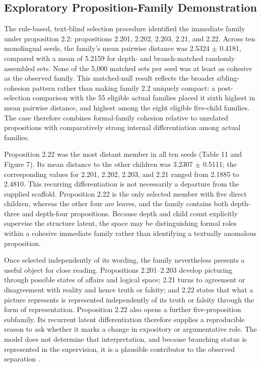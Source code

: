 \documentclass[webpdf,modern,medium,namedate]{oup-authoring-template}
\begin{document}
\clearpage
\subsection{Exploratory Proposition-Family Demonstration}
The rule-based, text-blind selection procedure identified the immediate family under proposition 2.2: propositions 2.201, 2.202, 2.203, 2.21, and 2.22. Across ten monolingual seeds, the family's mean pairwise distance was 2.5324 $\pm$ 0.4181, compared with a mean of 5.2159 for depth- and branch-matched randomly assembled sets. None of the 5,000 matched sets per seed was at least as cohesive as the observed family. This matched-null result reflects the broader sibling-cohesion pattern rather than making family 2.2 uniquely compact: a post-selection comparison with the 55 eligible actual families placed it sixth highest in mean pairwise distance, and highest among the eight eligible five-child families. The case therefore combines formal-family cohesion relative to unrelated propositions with comparatively strong internal differentiation among actual families.

Proposition 2.22 was the most distant member in all ten seeds (Table 11 and Figure 7). Its mean distance to the other children was 3.2307 $\pm$ 0.5111; the corresponding values for 2.201, 2.202, 2.203, and 2.21 ranged from 2.1885 to 2.4810. This recurring differentiation is not necessarily a departure from the supplied scaffold. Proposition 2.22 is the only selected member with five direct children, whereas the other four are leaves, and the family contains both depth-three and depth-four propositions. Because depth and child count explicitly supervise the structure latent, the space may be distinguishing formal roles within a cohesive immediate family rather than identifying a textually anomalous proposition.

Once selected independently of its wording, the family nevertheless presents a useful object for close reading. Propositions 2.201--2.203 develop picturing through possible states of affairs and logical space; 2.21 turns to agreement or disagreement with reality and hence truth or falsity; and 2.22 states that what a picture represents is represented independently of its truth or falsity through the form of representation. Proposition 2.22 also opens a further five-proposition subfamily. Its recurrent latent differentiation therefore supplies a reproducible reason to ask whether it marks a change in expository or argumentative role. The model does not determine that interpretation, and because branching status is represented in the supervision, it is a plausible contributor to the observed separation \citep{wittgenstein1922tractatus}.
\end{document}
